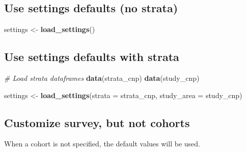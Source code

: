 \documentclass[
]{book}
\newenvironment{Shaded}{\begin{snugshade}}{\end{snugshade}}
\newcommand{\CommentTok}[1]{\textcolor[rgb]{0.56,0.35,0.01}{\textit{#1}}}
\newcommand{\DataTypeTok}[1]{\textcolor[rgb]{0.13,0.29,0.53}{#1}}
\newcommand{\KeywordTok}[1]{\textcolor[rgb]{0.13,0.29,0.53}{\textbf{#1}}}
\newcommand{\NormalTok}[1]{#1}
\newcommand{\StringTok}[1]{\textcolor[rgb]{0.31,0.60,0.02}{#1}}
\begin{document}
\hypertarget{use-settings-defaults-no-strata}{%
\subsection*{Use settings defaults (no strata)}\label{use-settings-defaults-no-strata}}

\begin{Shaded}
\begin{Highlighting}[]
\NormalTok{settings <-}\StringTok{ }\KeywordTok{load_settings}\NormalTok{()}
\end{Highlighting}
\end{Shaded}

\hypertarget{use-settings-defaults-with-strata}{%
\subsection*{Use settings defaults with strata}\label{use-settings-defaults-with-strata}}

\begin{Shaded}
\begin{Highlighting}[]
\CommentTok{# Load strata dataframes}
\KeywordTok{data}\NormalTok{(strata_cnp)}
\KeywordTok{data}\NormalTok{(study_cnp)}

\NormalTok{settings <-}\StringTok{ }\KeywordTok{load_settings}\NormalTok{(}\DataTypeTok{strata =}\NormalTok{ strata_cnp,}
                          \DataTypeTok{study_area =}\NormalTok{ study_cnp)}
\end{Highlighting}
\end{Shaded}

\hypertarget{customize-survey-but-not-cohorts}{%
\subsection*{Customize survey, but not cohorts}\label{customize-survey-but-not-cohorts}}

When a cohort is not specified, the default values will be used.
\end{document}
